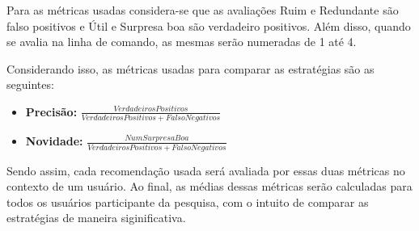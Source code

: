 Para as métricas usadas considera-se que as avaliações Ruim e Redundante são
falso positivos e Útil e Surpresa boa são verdadeiro positivos. Além disso,
quando se avalia na linha de comando, as mesmas serão numeradas de 1 até 4.

Considerando isso, as métricas usadas para comparar as estratégias são as
seguintes:

\begin{itemize}
    \item \textbf{Precisão: } $\frac{VerdadeirosPositivos}{VerdadeirosPositivos
        + FalsoNegativos}$
    \item \textbf{Novidade: } $\frac{NumSurpresaBoa}{VerdadeirosPositivos +
        FalsoNegativos}$
\end{itemize}

Sendo assim, cada recomendação usada será avaliada por essas duas métricas no
contexto de um usuário. Ao final, as médias dessas métricas serão calculadas para
todos os usuários participante da pesquisa, com o intuito de comparar as
estratégias de maneira siginificativa.
